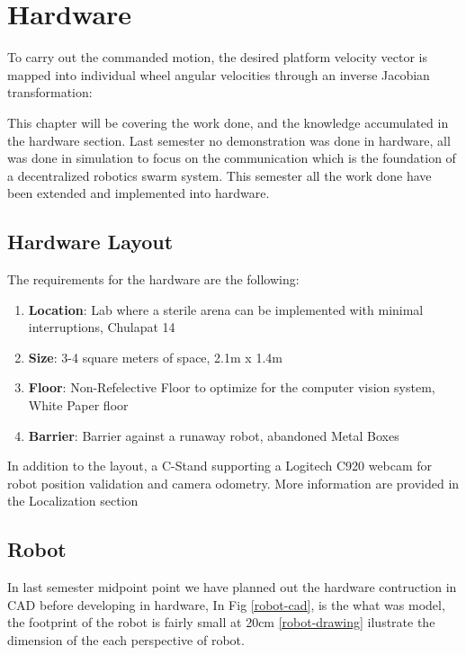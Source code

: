 \chapter{Hardware}
To carry out the commanded motion, the desired platform velocity vector is mapped into individual wheel angular velocities through an inverse Jacobian transformation:

This chapter will be covering the work done, and the knowledge accumulated in the hardware section. Last semester no demonstration was done in hardware, all was done in simulation to focus on the communication which is the foundation of a decentralized robotics swarm system. This semester all the work done have been extended and implemented into hardware. 

\section{Hardware Layout}
The requirements for the hardware are the following:

\begin{enumerate}
    \item \textbf{Location}: Lab where a sterile arena can be implemented with minimal interruptions, Chulapat 14
    \item \textbf{Size}: 3-4 square meters of space, 2.1m x 1.4m
    \item \textbf{Floor}: Non-Refelective Floor to optimize for the computer vision system, White Paper floor
    \item \textbf{Barrier}: Barrier against a runaway robot, abandoned Metal Boxes
\end{enumerate}
In addition to the layout, a C-Stand supporting a Logitech C920 webcam for robot position validation and camera odometry. More information are provided in the Localization section




\section{Robot}
In last semester midpoint point we have planned out the hardware contruction in CAD before developing in hardware, In Fig \ref{robot-cad}, is the what was model, the footprint of the robot is fairly small at 20cm \ref{robot-drawing} ilustrate the dimension of the each perspective of robot.

